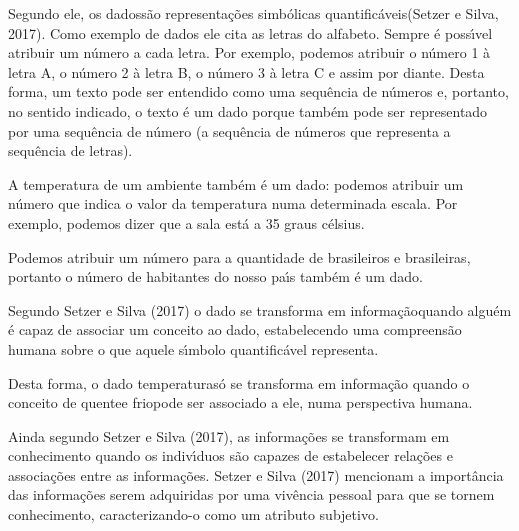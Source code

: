\documentclass[
12pt,		%
openright,	%
twoside,  %
a4paper,			%
chapter=TITLE,		%
english,			%
french,				%
spanish,			%
brazil				%
]{USPSC-classe/USPSC}
\begin{document}
Segundo ele, os \textquotedbl dados\textquotedbl  s\~ao \textquotedbl representa\c{c}\~oes simb\'olicas quantific\'aveis\textquotedbl   (Setzer e Silva, 2017). Como exemplo de dados ele cita as letras do alfabeto. Sempre \'e poss\'{\i}vel atribuir um n\'umero a cada letra. Por exemplo, podemos atribuir o n\'umero 1 \`a letra A, o n\'umero 2 \`a letra B, o n\'umero 3 \`a letra C e assim por diante. Desta forma, um texto pode ser entendido como uma sequ\^encia de n\'umeros e, portanto, no sentido indicado, o texto \'e um dado porque tamb\'em pode ser representado por uma sequ\^encia de n\'umero (a sequ\^encia de n\'umeros que representa a sequ\^encia de letras).









A temperatura de um ambiente tamb\'em \'e um dado: podemos atribuir um n\'umero que indica o valor da temperatura numa determinada escala. Por exemplo, podemos dizer que a sala \textquotedbl est\'a a 35 graus c\'elsius\textquotedbl .









Podemos atribuir um n\'umero para a quantidade de brasileiros e brasileiras, portanto o n\'umero de habitantes do nosso pa\'{\i}s tamb\'em \'e um dado.









Segundo Setzer e Silva (2017) o dado se transforma em \textquotedbl informa\c{c}\~ao\textquotedbl  quando algu\'em \'e capaz de associar um conceito ao dado, estabelecendo uma compreens\~ao humana sobre o que aquele s\'{\i}mbolo quantific\'avel representa.









Desta forma, o dado \textquotedbl temperatura\textquotedbl  s\'o se transforma em informa\c{c}\~ao quando o conceito de \textquotedbl quente\textquotedbl  e \textquotedbl frio\textquotedbl  pode ser associado a ele, numa perspectiva humana.









Ainda segundo Setzer e Silva (2017), as informa\c{c}\~oes se transformam em conhecimento quando os indiv\'{\i}duos s\~ao capazes de estabelecer rela\c{c}\~oes e associa\c{c}\~oes entre as informa\c{c}\~oes.  Setzer e Silva (2017) mencionam a import\^ancia das informa\c{c}\~oes serem adquiridas por uma viv\^encia pessoal para que se tornem conhecimento, caracterizando-o como um atributo subjetivo.
\end{document}
